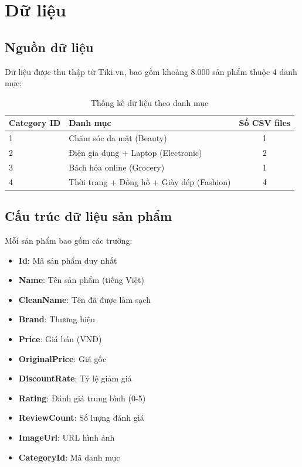 \documentclass[12pt,a4paper]{report}
\begin{document}
\section{Dữ liệu}

\subsection{Nguồn dữ liệu}

Dữ liệu được thu thập từ Tiki.vn, bao gồm khoảng 8.000 sản phẩm thuộc 4 danh mục:

\begin{table}[H]
\centering
\caption{Thống kê dữ liệu theo danh mục}
\label{tab:data_stats}
\begin{tabular}{llc}
\toprule
\textbf{Category ID} & \textbf{Danh mục} & \textbf{Số CSV files} \\
\midrule
1 & Chăm sóc da mặt (Beauty) & 1 \\
2 & Điện gia dụng + Laptop (Electronic) & 2 \\
3 & Bách hóa online (Grocery) & 1 \\
4 & Thời trang + Đồng hồ + Giày dép (Fashion) & 4 \\
\bottomrule
\end{tabular}
\end{table}

\subsection{Cấu trúc dữ liệu sản phẩm}

Mỗi sản phẩm bao gồm các trường:
\begin{itemize}
    \item \textbf{Id}: Mã sản phẩm duy nhất
    \item \textbf{Name}: Tên sản phẩm (tiếng Việt)
    \item \textbf{CleanName}: Tên đã được làm sạch
    \item \textbf{Brand}: Thương hiệu
    \item \textbf{Price}: Giá bán (VNĐ)
    \item \textbf{OriginalPrice}: Giá gốc
    \item \textbf{DiscountRate}: Tỷ lệ giảm giá
    \item \textbf{Rating}: Đánh giá trung bình (0-5)
    \item \textbf{ReviewCount}: Số lượng đánh giá
    \item \textbf{ImageUrl}: URL hình ảnh
    \item \textbf{CategoryId}: Mã danh mục
\end{itemize}
\end{document}
